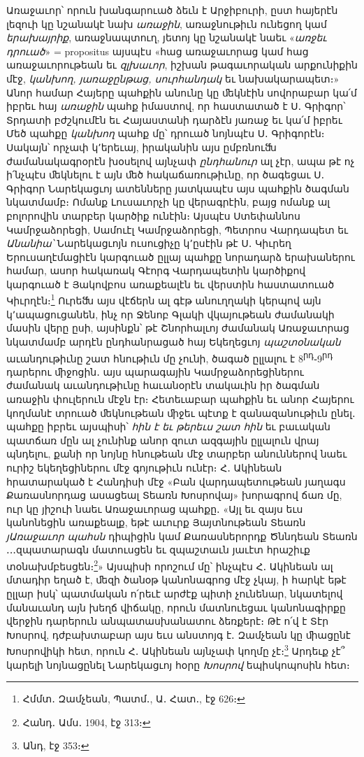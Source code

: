 \documentclass{article}
\begin{document}
{Առաջաւոր՝ որուն խանգարուած ձեւն է Արջիբուրի, ըստ հայերէն լեզուի կը նշանակէ նախ \emph{առաջին}, առաջնութիւն ունեցող կամ \emph{երախայրիք}, առաջնապտուղ, յետոյ կը նշանակէ նաեւ «\emph{առջեւ դրուած}» = propositus այսպէս «հաց առաջաւորաց կամ հաց առաջաւորութեան եւ \emph{զլխաւոր}, իշխան թագաւորական արքունիքին մէջ, \emph{կանխող, յառաջընթաց, սուրհանդակ} եւ նախակարապետ։» Անոր համար Հայերը պահքին անունը կը ﬔկնէին սովորաբար կա՛մ իբրեւ հայ \emph{առաջին} պահք իմաստով, որ հաստատած է Ս․ Գրիգոր՝ Տրդատի բժշկումէն եւ Հայաստանի դարձէն յառաջ եւ կա՛մ իբրեւ Մեծ պահքը \emph{կանխող} պահք մը՝ դրուած նոյնպէս Ս․ Գրիգորէն։ Սակայն՝ որչափ կ՚երեւայ, իրականին այս ըմբռնուﬓ ժամանակագրօրէն խօսելով այնչափ \emph{ընդհանուր} ալ չէր, ապա թէ ոչ ի՛նչպէս ﬔկնելու է այն ﬔծ հակաճառութիւնը, որ ծագեցաւ Ս․ Գրիգոր Նարեկացւոյ ատենները յատկապէս այս պահքին ծագման նկատմամբ։ Ոմանք Լուսաւորչի կը վերագրէին, բայց ոմանք ալ բոլորովին տարբեր կարծիք ունէին։ Այսպէս Ստեփաննոս Կամրջաձորեցի, Սամուէլ Կամրջաձորեցի, Պետրոս Վարդապետ եւ \emph{Անանիա՝} Նարեկացւոյն ուսուցիչը կ՚ըսէին թէ Ս․ Կիւրեղ Երուսաղէմացիէն կարգուած ըլլայ պահքը նորադարձ երախաներու համար, ասոր հակառակ Գէորգ Վարդապետին կարծիքով կարգուած է Յակովբոս առաքեալէն եւ վերստին հաստատուած Կիւրղէն։\footnote{Հմմտ․ Զամչեան, Պատմ․, Ա․ Հատ․, էջ 626։} Ուրեﬓ այս վէճերն ալ գէթ անուղղակի կերպով այն կ՚ապացուցանեն, ինչ որ Ջենոբ Գլակի վկայութեան ժամանակի մասին վերը ըսի, այսինքն՝ թէ Շնորհալւոյ ժամանակ Առաջաւորաց նկատմամբ արդէն ընդհանրացած հայ Եկեղեցւոյ \emph{պաշտօնական} աւանդութիւնը շատ հնութիւն մը չունի, ծագած ըլլալու է 8\textsuperscript{րդ}֊9\textsuperscript{րդ} դարերու ﬕջոցին․ այս պարագային Կամրջաձորեցիներու ժամանակ աւանդութիւնը հաւանօրէն տակաւին իր ծագման առաջին փուլերուն մէջն էր։ Հետեւաբար պահքին եւ անոր Հայերու կողմանէ տրուած ﬔկնութեան ﬕջեւ պէտք է զանազանութիւն ընել․ պահքը իբրեւ այսպիսի՝ \emph{հին է եւ թերեւս շատ հին} եւ բաւական պատճառ մըն ալ չունինք անոր զուտ ազգային ըլլալուն վրայ պնդելու, քանի որ նոյնը հնութեան մէջ տարբեր անուններով նաեւ ուրիշ եկեղեցիներու մէջ գոյութիւն ունէր։ Հ․ Ակինեան հրատարակած է Հանդիսի մէջ «Բան վարդապետութեան յաղագս Քառասնորդաց ասացեալ Տեառն Խոսրովայ» խորագրով ճառ մը, ուր կը յիշուի նաեւ Առաջաւորաց պահքը․ «Այլ եւ զայս եւս կանոնեցին առաքեալք, եթէ աւուրք Յայտնութեան Տեառն \emph{յԱռաջաւոր պահսն} դիպիցին կամ Քառասներորդք Ծննդեան Տեառն ․․․զպատարագն մատուսցեն եւ զպաշտաւն յաւէտ հրաշիւք տօնախմբեսցեն։\footnote{Հանդ․ Ամս․ 1904, էջ 313։}» Այսպիսի որոշում մը՝ ինչպէս Հ․ Ակինեան ալ մտադիր եղած է, ﬔզի ծանօթ կանոնագրոց մէջ չկայ, ի հարկէ եթէ ըլլար իսկ՝ պատմական ո՛րեւէ արժէք պիտի չունենար, նկատելով մանաւանդ այն խեղճ վիճակը, որուն մատնուեցաւ կանոնագիրքը վերջին դարերուն անպատասխանատու ձեռքերէ։ Թէ ո՛վ է Տէր Խոսրով, դժբախտաբար այս եւս անստոյգ է․ Զամչեան կը ﬕացընէ Խոսրովիկի հետ, որուն Հ․ Ակինեան այնչափ կողմը չէ։\footnote{Անդ, էջ 353։} Արդեւք չէ՞ կարելի նոյնացընել Նարեկացւոյ հօրը \emph{Խոսրով} եպիսկոպոսին հետ։

}
\end{document}
